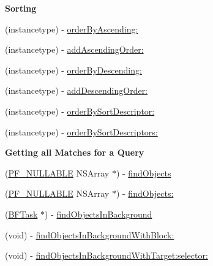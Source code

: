 \begin{Indent}{\bf Sorting}\par
{\em 

 

 }\begin{DoxyCompactItemize}
\item 
(instancetype) -\/ \hyperlink{interface_p_f_query_a5dbb9ee5c793aead5bae8d13d9d5f887}{order\+By\+Ascending\+:}
\item 
(instancetype) -\/ \hyperlink{interface_p_f_query_ae2be0a54cc4421be06d320f4f39e2996}{add\+Ascending\+Order\+:}
\item 
(instancetype) -\/ \hyperlink{interface_p_f_query_a013115084380b1fc73b10a578b1e7745}{order\+By\+Descending\+:}
\item 
(instancetype) -\/ \hyperlink{interface_p_f_query_a16a4545bd7ca6b86bb59c3d131f55ec9}{add\+Descending\+Order\+:}
\item 
(instancetype) -\/ \hyperlink{interface_p_f_query_a06d9f1b916c9787fff90f96f1a15e60f}{order\+By\+Sort\+Descriptor\+:}
\item 
(instancetype) -\/ \hyperlink{interface_p_f_query_a331842043a6103dc98f0d659afdb17e2}{order\+By\+Sort\+Descriptors\+:}
\end{DoxyCompactItemize}
\end{Indent}
\begin{Indent}{\bf Getting all Matches for a Query}\par
{\em 

 

 }\begin{DoxyCompactItemize}
\item 
(\hyperlink{_p_f_nullability_8h_a528d97a96c5fb279a45c378f5657fca2}{P\+F\+\_\+\+N\+U\+L\+L\+A\+B\+L\+E} N\+S\+Array $\ast$) -\/ \hyperlink{interface_p_f_query_a31b0bc0961a1dd7560872520a67cbf2f}{find\+Objects}
\item 
(\hyperlink{_p_f_nullability_8h_a528d97a96c5fb279a45c378f5657fca2}{P\+F\+\_\+\+N\+U\+L\+L\+A\+B\+L\+E} N\+S\+Array $\ast$) -\/ \hyperlink{interface_p_f_query_a8abb58640ec4c0849880899137b1331c}{find\+Objects\+:}
\item 
(\hyperlink{interface_b_f_task}{B\+F\+Task} $\ast$) -\/ \hyperlink{interface_p_f_query_a99acd2ba12ee2208eb13939c8d207b8b}{find\+Objects\+In\+Background}
\item 
(void) -\/ \hyperlink{interface_p_f_query_a1be68026626091288b00494fb6b3c6fd}{find\+Objects\+In\+Background\+With\+Block\+:}
\item 
(void) -\/ \hyperlink{interface_p_f_query_accc1cb4909f77478f7d51beaaef496b8}{find\+Objects\+In\+Background\+With\+Target\+:selector\+:}
\end{DoxyCompactItemize}
\end{Indent}
